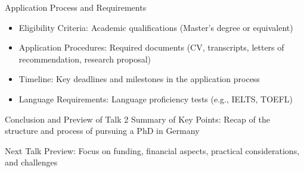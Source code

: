 \documentclass[10pt]{beamer}
\begin{document}
\begin{frame}[fragile]{Application Process and Requirements}
\begin{itemize}
	\item Eligibility Criteria: Academic qualifications (Master’s degree or equivalent)
	\item Application Procedures: Required documents (CV, transcripts, letters of recommendation, research proposal)
	\item Timeline: Key deadlines and milestones in the application process
	\item Language Requirements: Language proficiency tests (e.g., IELTS, TOEFL)
\end{itemize}
\end{frame}

\begin{frame}[fragile]{Conclusion and Preview of Talk 2}
	Summary of Key Points: Recap of the structure and process of pursuing a PhD in Germany

	Next Talk Preview: Focus on funding, financial aspects, practical considerations, and challenges
\end{frame}
\end{document}
